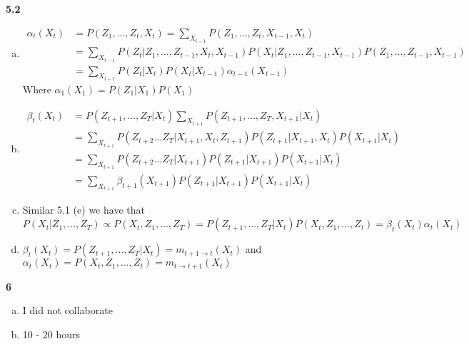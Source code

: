 \documentclass{article}
\begin{document}
\textbf{5.2}\begin{enumerate}[(a)]
    \item 
    \begin{align*}
        \alpha_t(X_t) &= P(Z_1, \dots, Z_t, X_t) = \sum_{X_{t - 1}}P(Z_1, \dots, Z_t, X_{t - 1}, X_t) \\
        &= \sum_{X_{t - 1}}P(Z_t |Z_1, \dots, Z_{t - 1}, X_t, X_{t - 1}) P(X_t | Z_1, \dots, Z_{t - 1}, X_{t - 1}) P(Z_1, \dots, Z_{t - 1}, X_{t - 1}) \\
        &= \sum_{X_{t - 1}}P(Z_t | X_t) P(X_t | X_{t - 1}) \alpha_{t - 1}(X_{t - 1})
    \end{align*}
    Where $\alpha_1(X_1) = P(Z_1 | X_1) P(X_1)$
    \item \begin{align*}
        \beta_t(X_t) &= P(Z_{t + 1}, \dots, Z_T | X_t)\sum_{X_{t + 1}}P(Z_{t + 1}, \dots, Z_T, X_{t + 1} | X_t) \\ 
        &= \sum_{X_{t + 1}}P(Z_{t + 2} \dots Z_T | X_{t + 1}, X_t, Z_{t + 1}) P(Z_{t + 1} | X_{t + 1}, X_{t})P(X_{t + 1} | X_{t}) \\
        &= \sum_{X_{t + 1}}P(Z_{t + 2} \dots Z_T | X_{t + 1}) P(Z_{t + 1} | X_{t + 1})P(X_{t + 1} | X_{t}) \\ 
        &= \sum_{X_{t + 1}}\beta_{t + 1}(X_{t + 1}) P(Z_{t + 1} | X_{t + 1})P(X_{t + 1} | X_{t})
    \end{align*}
    \item Similar 5.1 (e) we have that  $P(X_t | Z_1, \dots , Z_T) \propto P(X_t, Z_1,\dots,Z_T) = P(Z_{t + 1}, \dots , Z_T | X_t)P(X_t, Z_1, \dots,Z_t) = \beta_t(X_t)\alpha_t(X_t)$
    \item $\beta_t(X_t) = P(Z_{t + 1}, \dots , Z_T | X_t) = m_{t + 1 \rightarrow t}(X_t)$ and $\alpha_t(X_t) = P(X_t, Z_1, \dots,Z_t) = m_{t \rightarrow t + 1}(X_t)$
\end{enumerate}
\textbf{6}\begin{enumerate}[(a)]
    \item I did not collaborate 
    \item 10 - 20 hours
\end{enumerate}
\end{document}

